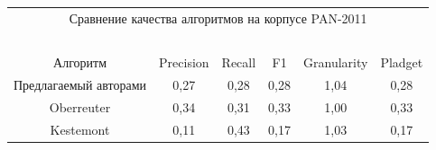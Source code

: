 \begin{table}\small

\vspace*{6pt}

\begin{center}





\begin{tabular}{|c|c|c|c|c|c|}

\multicolumn{6}{c}{Сравнение качества алгоритмов на корпусе  PAN-2011}\\

\multicolumn{6}{c}{\ }\\[-6pt]

\hline

Алгоритм & Precision & Recall& F1& Granularity& Pladget\\

\hline

 Предлагаемый авторами &  0,27& 0,28& 0,28& 1,04& 0,28\\

 Oberreuter & 0,34& 0,31& 0,33& 1,00& 0,33\\

 Kestemont& 0,11& 0,43& 0,17& 1,03& 0,17\\

\hline

\end{tabular}

\end{center}

\vspace*{6pt}

\end{table}



